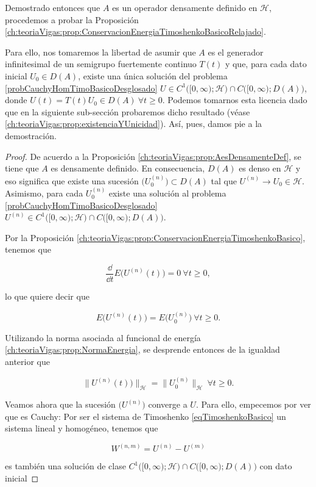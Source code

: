 Demostrado entonces que $A$ es un operador densamente definido en $\mathcal{H}$, procedemos a probar la Proposición \eqref{ch:teoriaVigas:prop:ConservacionEnergiaTimoshenkoBasicoRelajado}. 

Para ello, nos tomaremos la libertad de asumir que $A$ es el generador infinitesimal de un semigrupo fuertemente continuo $T(t)$ y que, para cada dato inicial $U_0 \in D(A)$, existe una única solución del problema \eqref{probCauchyHomTimoBasicoDesglosado} $U \in C^1\big([0,\infty); \mathcal{H}\big) \cap C\big([0,\infty); D(A)\big)$, donde $U(t) = T(t)U_0 \in D(A) \ \forall t \geq 0$. Podemos tomarnos esta licencia dado que en la siguiente sub-sección probaremos dicho resultado (véase \eqref{ch:teoriaVigas:prop:existenciaYUnicidad}). Así, pues, damos pie a la demostración.

\begin{proof}
    De acuerdo a la Proposición \eqref{ch:teoriaVigas:prop:AesDensamenteDef}, se tiene que $A$ es densamente definido. En consecuencia, $D(A)$ es denso en $\mathcal{H}$ y eso significa que existe una sucesión $\Big(U_0^{(n)}\Big) \subset D(A)$ tal que $U^{(n)} \rightarrow U_0 \in \mathcal{H}$. Asimismo, para cada $U_0^{(n)}$ existe una solución al problema \eqref{probCauchyHomTimoBasicoDesglosado} $U^{(n)} \in C^1\big([0,\infty); \mathcal{H}\big) \cap C\big([0,\infty); D(A) \big)$.

    Por la Proposición \eqref{ch:teoriaVigas:prop:ConservacionEnergiaTimoshenkoBasico}, tenemos que

    \[\frac{\dd}{\dd t}E\big(U^{(n)}(t)\big) = 0 \ \forall t \geq 0,\]

    lo que quiere decir que

    \[E\big(U^{(n)}(t)\big) = E\big(U^{(n)}_0\big) \ \forall t \geq 0.\]

    Utilizando la norma asociada al funcional de energía \eqref{ch:teoriaVigas:prop:NormaEnergia}, se desprende entonces de la igualdad anterior que

    \[\big\lVert U^{(n)}(t)\big)\rVert_{\mathcal{H}} = \big\lVert U^{(n)}_0\big\rVert_{\mathcal{H}} \ \forall t \geq 0.\]

    Veamos ahora que la sucesión $\big(U^{(n)}\big)$ converge a $U$. Para ello, empecemos por ver que es Cauchy: Por ser el sistema de Timoshenko \eqref{eqTimoshenkoBasico} un sistema lineal y homogéneo, tenemos que

    \[W^{(n,m)} = U^{(n)} - U^{(m)}\]

    es también una solución de clase $C^1\big([0,\infty); \mathcal{H}\big) \cap C\big([0,\infty); D(A) \big)$ con dato inicial


\end{proof}
